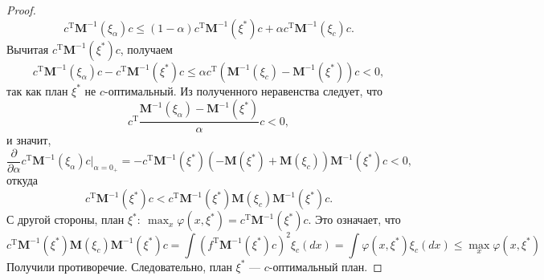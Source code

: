 \documentclass[12pt, a4paper]{article}
\begin{document}
\begin{proof}
		\begin{equation*}
			c^\mathrm{T}\mathbf{M}^{-1}(\xi_\alpha)c\leqslant (1-\alpha)c^\mathrm{T}\mathbf{M}^{-1}(\xi^*)c + \alpha c^\mathrm{T}\mathbf{M}^{-1}(\xi_c)c.
		\end{equation*}
		Вычитая $c^\mathrm{T}\mathbf{M}^{-1}(\xi^*)c$, получаем
		\begin{equation*}
		c^\mathrm{T}\mathbf{M}^{-1}(\xi_\alpha)c-c^\mathrm{T}\mathbf{M}^{-1}(\xi^*)c\leqslant \alpha c^\mathrm{T}(\mathbf{M}^{-1}(\xi_c)-\mathbf{M}^{-1}(\xi^*))c<0,
		\end{equation*}
		так как план $\xi^*$ не $c$-оптимальный. Из полученного неравенства следует, что
		\begin{equation*}
			c^\mathrm{T}\dfrac{\mathbf{M}^{-1}(\xi_\alpha)-\mathbf{M}^{-1}(\xi^*)}{\alpha}c<0,
		\end{equation*}
		и значит,
		\begin{equation*}
			\dfrac{\partial}{\partial\alpha}c^\mathrm{T}\mathbf{M}^{-1}(\xi_\alpha)c|_{\alpha=0_+}=-c^\mathrm{T}\mathbf{M}^{-1}(\xi^*)\left(-\mathbf{M}(\xi^*)+\mathbf{M}(\xi_c)\right)\mathbf{M}^{-1}(\xi^*)c<0,
		\end{equation*}
		откуда
		\begin{equation*}
			c^\mathrm{T}\mathbf{M}^{-1}(\xi^*)c < c^\mathrm{T}\mathbf{M}^{-1}(\xi^*)\mathbf{M}(\xi_c)\mathbf{M}^{-1}(\xi^*)c.
		\end{equation*}
		С другой стороны, план $\xi^*:~\max_x\varphi(x,\xi^*)=c^\mathrm{T}\mathbf{M}^{-1}(\xi^*)c$. Это означает, что
		\begin{equation*}
			c^\mathrm{T}\mathbf{M}^{-1}(\xi^*)\mathbf{M}(\xi_c)\mathbf{M}^{-1}(\xi^*)c=\int(f^\mathrm{T}\mathbf{M}^{-1}(\xi^*)c)^2\xi_c(dx)=\int\varphi(x,\xi^*)\xi_c(dx)\leqslant \max_x\varphi(x,\xi^*)
		\end{equation*}
		Получили противоречие. Следовательно, план $\xi^*$ --- $c$-оптимальный план.
	\end{proof}
\end{document}
